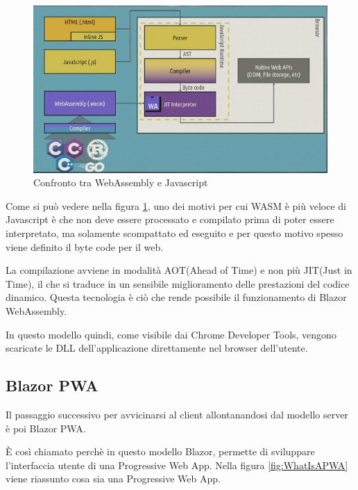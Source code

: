 \begin{figure}[H]
	\centerline{\includegraphics[scale=0.7]{figure/WasmVSJavascript.PNG}}
	\caption{Confronto tra WebAssembly e Javascript}
	\label{fig:WasmVSJavascript}
\end{figure}

Come si pu\`o vedere nella figura \ref{fig:WasmVSJavascript}, uno dei motivi per cui WASM \`e pi\`u veloce di Javascript \`e che non deve essere processato e compilato prima di poter essere interpretato, ma solamente scompattato ed eseguito e per questo motivo spesso viene definito il byte code per il web.

La compilazione avviene in modalit\`a AOT(Ahead of Time) e non pi\`u JIT(Just in Time), il che si traduce in un sensibile miglioramento delle prestazioni del codice dinamico.
Questa tecnologia \`e ci\`o che rende possibile il funzionamento di Blazor WebAssembly.

In questo modello quindi, come visibile dai Chrome Developer Tools, vengono scaricate le DLL dell'applicazione direttamente nel browser dell'utente.

\subsection{Blazor PWA}\label{sez:bpwa}
Il passaggio successivo per avvicinarsi al client allontanandosi dal modello server \`e poi Blazor PWA.

\`E cos\`i chiamato perch\`e in questo modello Blazor, permette di sviluppare l'interfaccia utente di una Progressive Web App.
Nella figura \ref{fig:WhatIsAPWA} viene riassunto cosa sia una Progressive Web App.

